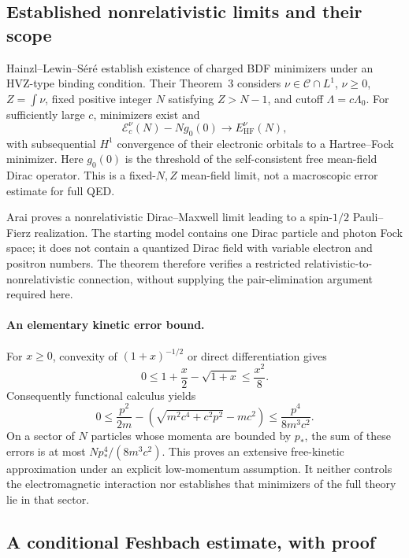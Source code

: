\subsection{Established nonrelativistic limits and their scope}
\label{app-rel:nr-limits}

Hainzl--Lewin--S\'er\'e \cite{HLS2008} establish existence of charged BDF
minimizers under an HVZ-type binding condition. Their Theorem~3 considers
$\nu\in\mathcal C\cap L^1$, $\nu\ge0$, $Z=\int\nu$, fixed positive integer
$N$ satisfying $Z>N-1$, and cutoff $\Lambda=c\Lambda_0$. For sufficiently
large $c$, minimizers exist and
\begin{equation}
 \mathcal E_c^\nu(N)-N g_0(0)
       \longrightarrow E_{\mathrm{HF}}^\nu(N),
 \label{app-rel:bdf-nr-limit}
\end{equation}
with subsequential $H^1$ convergence of their electronic orbitals to a
Hartree--Fock minimizer. Here $g_0(0)$ is the threshold of the
self-consistent free mean-field Dirac operator. This is a fixed-$N,Z$
mean-field limit, not a macroscopic error estimate for full QED.

Arai \cite{Arai2003} proves a nonrelativistic Dirac--Maxwell limit leading
to a spin-$1/2$ Pauli--Fierz realization. The starting model contains one
Dirac particle and photon Fock space; it does not contain a quantized
Dirac field with variable electron and positron numbers. The theorem
therefore verifies a restricted relativistic-to-nonrelativistic connection,
without supplying the pair-elimination argument required here.

\paragraph{An elementary kinetic error bound.}
For $x\ge0$, convexity of $(1+x)^{-1/2}$ or direct differentiation gives
\[
 0\le 1+\frac{x}{2}-\sqrt{1+x}\le\frac{x^2}{8}.
\]
Consequently functional calculus yields
\begin{equation}
 0\le\frac{p^2}{2m}
 -\left(\sqrt{m^2c^4+c^2p^2}-mc^2\right)
 \le\frac{p^4}{8m^3c^2}.
 \label{app-rel:kinetic-error}
\end{equation}
On a sector of $N$ particles whose momenta are bounded by $p_*$, the
sum of these errors is at most $Np_*^4/(8m^3c^2)$. This proves an extensive
free-kinetic approximation under an explicit low-momentum assumption.
It neither controls the electromagnetic interaction nor establishes that
minimizers of the full theory lie in that sector.

\subsection{A conditional Feshbach estimate, with proof}
\label{app-rel:feshbach}

